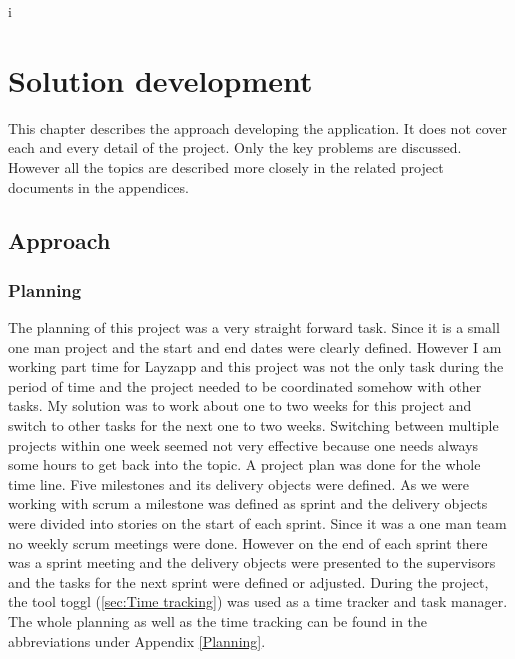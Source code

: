 i%

\chapter{Solution development} %

\label{Solution development} %



This chapter describes the approach developing the application. It does not cover each and every detail of the project. Only the key problems are discussed. However all the topics are described more closely in the related project documents in the appendices.

\section{Approach}

\subsection{Planning}

The planning of this project was a very straight forward task. Since it is a small one man project and the start and end dates were clearly defined.  However I am working part time for Layzapp and this project was not the only task during the period of time and the project needed to be coordinated somehow with other tasks. My solution was to work about one to two weeks for this project and switch to other tasks for the next one to two weeks. Switching between multiple projects within one week seemed not very effective because one needs always some hours to get back into the topic. \linebreak
A project plan was done for the whole time line. Five milestones and its delivery objects were defined. As we were working with scrum a milestone was defined as sprint and the delivery objects were divided into stories on the start of each sprint. Since it was a one man team no weekly scrum meetings were done. However on the end of each sprint there was a sprint meeting and the delivery objects were presented to the supervisors and the tasks for the next sprint were defined or adjusted. During the project, the tool toggl (\ref{sec:Time tracking}) was used as a time tracker and task manager. The whole planning as well as the time tracking can be found in the abbreviations under Appendix \ref{Planning}.

